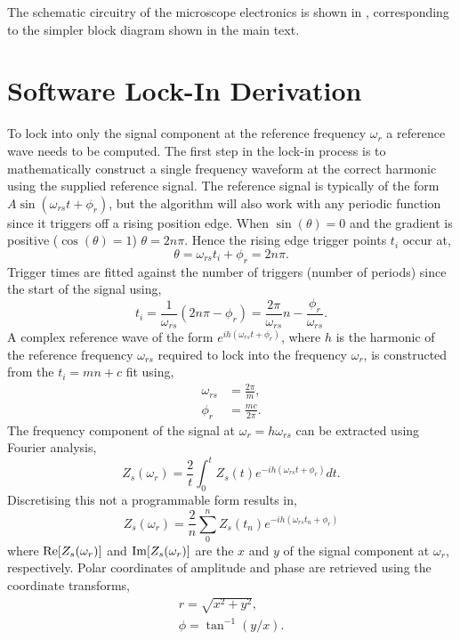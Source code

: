 \documentclass[12pt, a4paper, oneside]{book}
\begin{document}
The schematic circuitry of the microscope electronics is shown in , corresponding to the simpler block diagram shown in the main text.

\section{Software Lock-In Derivation}

To lock into only the signal component at the reference frequency $\omega_r$ a reference wave needs to be computed. The first step in the lock-in process is to mathematically construct a single frequency waveform at the correct harmonic using the supplied reference signal. The reference signal is typically of the form $A\sin(\omega_{rs} t + \phi_r)$, but the algorithm will also work with any periodic function since it triggers off a rising position edge.
When $\sin(\theta)=0$ and the gradient is positive ($\cos(\theta)=1$) $\theta=2n\pi$. Hence the rising edge trigger points $t_i$ occur at,
\begin{equation} \theta = \omega_{rs} t_i + \phi_r = 2n\pi. \end{equation}
Trigger times are fitted against the number of triggers (number of periods) since the start of the signal using,
\begin{equation}
t_i = \frac{1}{\omega_{rs}}(2n\pi - \phi_r) = \frac{2\pi}{\omega_{rs}}n - \frac{\phi_r}{\omega_{rs}}.
\end{equation}
A complex reference wave of the form $e^{ih(\omega_{rs} t + \phi_r)}$, where $h$ is the harmonic of the reference frequency $\omega_{rs}$ required to lock into the frequency $\omega_r$, is constructed from the $t_i=mn+c$ fit using,
\begin{align}
\omega_{rs} &= \frac{2\pi}{m}, \\
\phi_r &= \frac{mc}{2\pi}.
\end{align}
The frequency component of the signal at $\omega_r=h\omega_{rs}$ can be extracted using Fourier analysis,
\begin{equation}
Z_s(\omega_r) = \frac{2}{t} \int_0^t{Z_s(t) e^{-ih(\omega_{rs} t + \phi_r)} dt}.
\end{equation}
Discretising this not a programmable form results in,
\begin{equation}
Z_s(\omega_r) = \frac{2}{n} \sum_0^n{Z_s(t_n) e^{-ih(\omega_{rs} t_n + \phi_r)}}
\end{equation}
where $\mathrm{Re}\!\left[{Z_s(\omega_r)}\right]$ and $\mathrm{Im}\!\left[{Z_s(\omega_r)}\right]$ are the $x$ and $y$ of the signal component at $\omega_r$, respectively. Polar coordinates of amplitude and phase are retrieved using the coordinate transforms,
\begin{align}
r = \sqrt{x^2 + y^2}, \\
\phi = \tan^{-1}(y/x).
\end{align}
\end{document}
